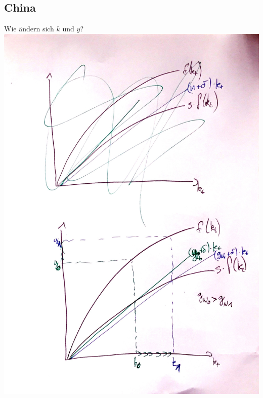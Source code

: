 \documentclass{scrartcl}
\begin{document}
\subsection{China}
Wie \"{a}ndern sich $k$ und $y$?\\
\includegraphics[width=\textwidth,keepaspectratio]{Bilder/SolowChina.pdf}
\end{document}
